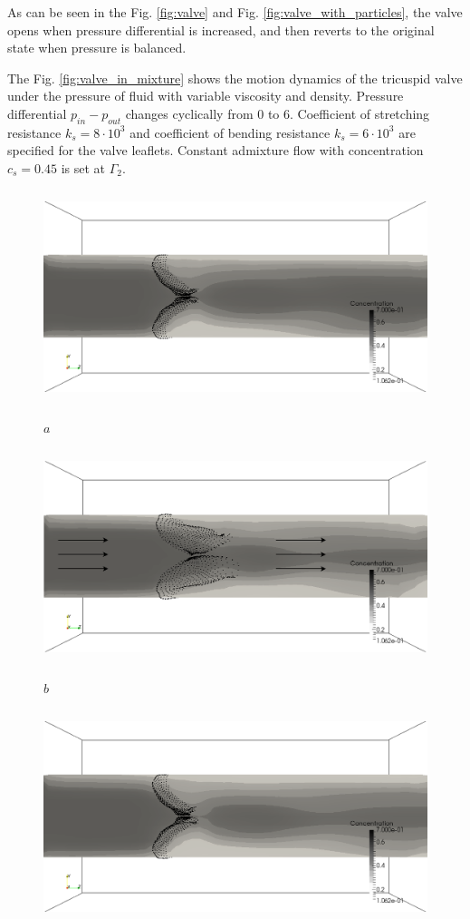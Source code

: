 \documentclass[runningheads,a4paper]{llncs}
\begin{document}
As can be seen in the Fig. \ref{fig:valve} and Fig. \ref{fig:valve_with_particles}, the valve opens when pressure differential is increased,
and then reverts to the original state when pressure is balanced.

The Fig. \ref{fig:valve_in_mixture} shows the motion dynamics of the tricuspid valve under the pressure of fluid with variable viscosity and
density. Pressure differential $p_{in} - p_{out}$ changes cyclically from 0 to 6. Coefficient of stretching resistance $k_s = 8 \cdot 10^3$ and coefficient of
bending resistance $k_s = 6 \cdot 10^3$ are specified for the valve leaflets. Constant admixture flow with concentration $c_s = 0.45$ is set at $\Gamma_2$.

\begin{figure}
\centering
\includegraphics[height=6.2cm]{images/valves_in_mixture_gray_scale_400.png}

$a$

\includegraphics[height=6.2cm]{images/valves_in_mixture_gray_scale_500.png}

$b$

\includegraphics[height=6.2cm]{images/valves_in_mixture_gray_scale_600.png}


\end{figure}
\end{document}
